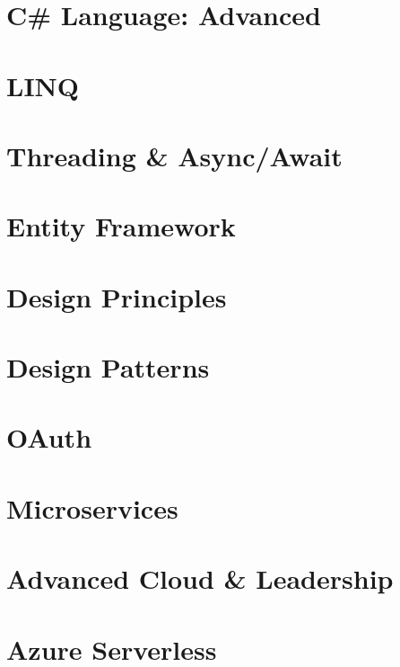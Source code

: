 \documentclass{mybeamer}
\begin{document}
\hypertarget{sec3}{}
\section{C\# Language: Advanced}


\hypertarget{sec4}{}
\section{LINQ}


\hypertarget{sec5}{}
\section{Threading \& Async/Await}


\hypertarget{sec6}{}
\section{Entity Framework}


\hypertarget{sec7}{}
\section{Design Principles}


\hypertarget{sec8}{}
\section{Design Patterns}


\hypertarget{sec9}{}
\section{OAuth}


\hypertarget{sec10}{}
\section{Microservices}


\hypertarget{sec11}{}
\section{Advanced Cloud \& Leadership}


\hypertarget{sec12}{}
\section{Azure Serverless}

\end{document}
